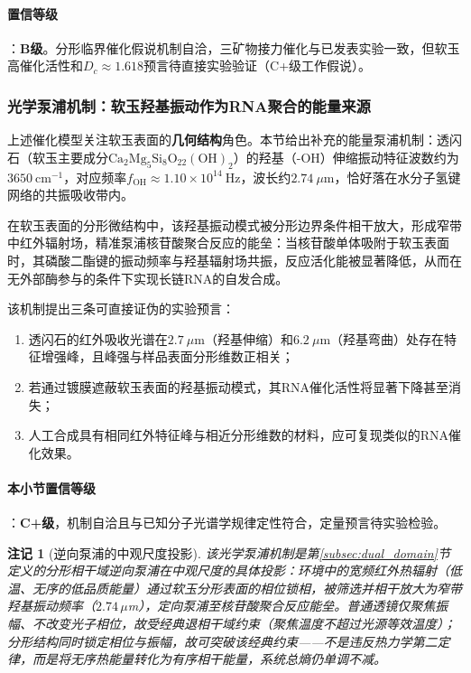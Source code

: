 \documentclass[12pt,a4paper,twocolumn]{article}
\newtheorem{remark}[theorem]{注记}
\begin{document}
\paragraph{置信等级}：\textbf{B级}。分形临界催化假说机制自洽，三矿物接力催化与已发表实验一致，但软玉高催化活性和$D_c\approx1.618$预言待直接实验验证（C+级工作假说）。

\subsubsection{光学泵浦机制：软玉羟基振动作为RNA聚合的能量来源}
\label{subsec:jade_pump_mechanism}
上述催化模型关注软玉表面的\textbf{几何结构}角色。本节给出补充的能量泵浦机制：透闪石（软玉主要成分$\text{Ca}_2\text{Mg}_5\text{Si}_8\text{O}_{22}(\text{OH})_2$）的羟基（-OH）伸缩振动特征波数约为$3650\ \text{cm}^{-1}$，对应频率$f_{\text{OH}} \approx 1.10 \times 10^{14}\ \text{Hz}$，波长约$2.74\ \mu\text{m}$，恰好落在水分子氢键网络的共振吸收带内。

在软玉表面的分形微结构中，该羟基振动模式被分形边界条件相干放大，形成窄带中红外辐射场，精准泵浦核苷酸聚合反应的能垒：当核苷酸单体吸附于软玉表面时，其磷酸二酯键的振动频率与羟基辐射场共振，反应活化能被显著降低，从而在无外部酶参与的条件下实现长链RNA的自发合成。

该机制提出三条可直接证伪的实验预言：
\begin{enumerate}
\item 透闪石的红外吸收光谱在$2.7\ \mu\text{m}$（羟基伸缩）和$6.2\ \mu\text{m}$（羟基弯曲）处存在特征增强峰，且峰强与样品表面分形维数正相关；
\item 若通过镀膜遮蔽软玉表面的羟基振动模式，其RNA催化活性将显著下降甚至消失；
\item 人工合成具有相同红外特征峰与相近分形维数的材料，应可复现类似的RNA催化效果。
\end{enumerate}

\paragraph{本小节置信等级}：\textbf{C+级}，机制自洽且与已知分子光谱学规律定性符合，定量预言待实验检验。

\begin{remark}[逆向泵浦的中观尺度投影]
该光学泵浦机制是第\ref{subsec:dual_domain}节定义的分形相干域逆向泵浦在中观尺度的具体投影：环境中的宽频红外热辐射（低温、无序的低品质能量）通过软玉分形表面的相位锁相，被筛选并相干放大为窄带羟基振动频率（$2.74\,\mu$m），定向泵浦至核苷酸聚合反应能垒。普通透镜仅聚焦振幅、不改变光子相位，故受经典退相干域约束（聚焦温度不超过光源等效温度）；分形结构同时锁定相位与振幅，故可突破该经典约束——不是违反热力学第二定律，而是将无序热能量转化为有序相干能量，系统总熵仍单调不减。
\end{remark}
\end{document}
